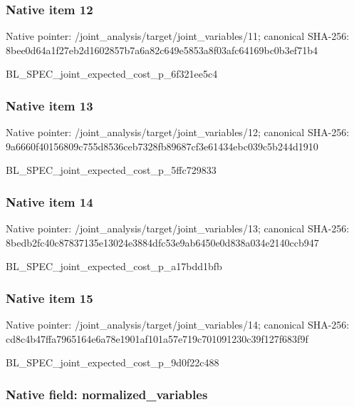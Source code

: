 \documentclass[10pt,a4paper]{article}
\begin{document}
\subsubsection{Native item 12}


Native pointer: /joint\_analysis/target/j\allowbreak{}oint\_variables/11; canonical SHA-256: 8bee0d64a1f27eb2d1602857\allowbreak{}b7a6a82c649e5853a8f03afc\allowbreak{}64169bc0b3ef71b4


BL\_SPEC\_joint\_expected\_c\allowbreak{}ost\_p\_6f321ee5c4


\subsubsection{Native item 13}


Native pointer: /joint\_analysis/target/j\allowbreak{}oint\_variables/12; canonical SHA-256: 9a6660f40156809c755d8536\allowbreak{}ceb7328fb89687cf3e61434e\allowbreak{}bc039c5b244d1910


BL\_SPEC\_joint\_expected\_c\allowbreak{}ost\_p\_5ffc729833


\subsubsection{Native item 14}


Native pointer: /joint\_analysis/target/j\allowbreak{}oint\_variables/13; canonical SHA-256: 8bedb2fc40c87837135e1302\allowbreak{}4e3884dfc53e9ab6450e0d83\allowbreak{}8a034e2140ccb947


BL\_SPEC\_joint\_expected\_c\allowbreak{}ost\_p\_a17bdd1bfb


\subsubsection{Native item 15}


Native pointer: /joint\_analysis/target/j\allowbreak{}oint\_variables/14; canonical SHA-256: cd8c4b47ffa7965164e6a78e\allowbreak{}1901af101a57e719c7010912\allowbreak{}30c39f127f683f9f


BL\_SPEC\_joint\_expected\_c\allowbreak{}ost\_p\_9d0f22c488


\subsubsection{Native field: normalized\_variables}
\end{document}
